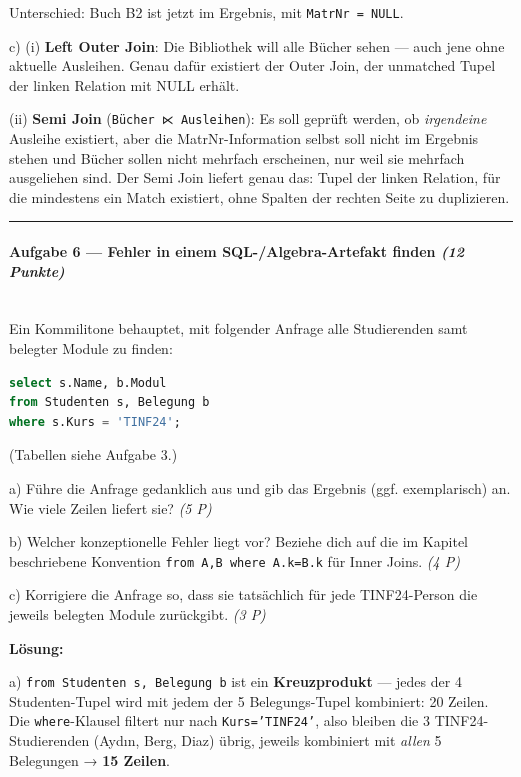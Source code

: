 \documentclass[11pt, a4paper]{article}
\begin{document}
Unterschied: Buch B2 ist jetzt im Ergebnis, mit \texttt{MatrNr = NULL}.


c) (i) \textbf{Left Outer Join}: Die Bibliothek will alle Bücher sehen — auch jene ohne aktuelle Ausleihen. Genau dafür existiert der Outer Join, der unmatched Tupel der linken Relation mit NULL erhält.


(ii) \textbf{Semi Join} (\texttt{Bücher ⋉ Ausleihen}): Es soll geprüft werden, ob \textit{irgendeine} Ausleihe existiert, aber die MatrNr-Information selbst soll nicht im Ergebnis stehen und Bücher sollen nicht mehrfach erscheinen, nur weil sie mehrfach ausgeliehen sind. Der Semi Join liefert genau das: Tupel der linken Relation, für die mindestens ein Match existiert, ohne Spalten der rechten Seite zu duplizieren.



\noindent\textcolor{rulegray}{\rule{\linewidth}{0.4pt}}


\paragraph{Aufgabe 6 — Fehler in einem SQL-/Algebra-Artefakt finden \textit{(12 Punkte)}}\mbox{}\\[2pt]

Ein Kommilitone behauptet, mit folgender Anfrage alle Studierenden samt belegter Module zu finden:


\begin{lstlisting}[language=sql]
select s.Name, b.Modul
from Studenten s, Belegung b
where s.Kurs = 'TINF24';
\end{lstlisting}


(Tabellen siehe Aufgabe 3.)


a) Führe die Anfrage gedanklich aus und gib das Ergebnis (ggf. exemplarisch) an. Wie viele Zeilen liefert sie? \textit{(5 P)}

b) Welcher konzeptionelle Fehler liegt vor? Beziehe dich auf die im Kapitel beschriebene Konvention \texttt{from A,B where A.k=B.k} für Inner Joins. \textit{(4 P)}

c) Korrigiere die Anfrage so, dass sie tatsächlich für jede TINF24-Person die jeweils belegten Module zurückgibt. \textit{(3 P)}


\textbf{Lösung:}


a) \texttt{from Studenten s, Belegung b} ist ein \textbf{Kreuzprodukt} — jedes der 4 Studenten-Tupel wird mit jedem der 5 Belegungs-Tupel kombiniert: 20 Zeilen. Die \texttt{where}-Klausel filtert nur nach \texttt{Kurs='TINF24'}, also bleiben die 3 TINF24-Studierenden (Aydın, Berg, Diaz) übrig, jeweils kombiniert mit \textit{allen} 5 Belegungen → \textbf{15 Zeilen}.
\end{document}
